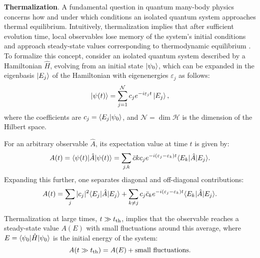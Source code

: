 



\textbf{Thermalization}.
A fundamental question in quantum many-body physics concerns how and under which conditions an isolated quantum system approaches thermal equilibrium. Intuitively, thermalization implies that after sufficient evolution time, local observables lose memory of the system's initial conditions and approach steady-state values corresponding to thermodynamic equilibrium \cite{khlebnikov_thermalization_2014}. To formalize this concept, consider an isolated quantum system described by a Hamiltonian $\hat{H}$, evolving from an initial state $\left| \psi_0 \right\rangle$, which can be expanded in the eigenbasis ${\left| E_j \right\rangle}$ of the Hamiltonian with eigenenergies $\varepsilon_j$ as follows:
\begin{equation*}
\left| \psi(t) \right\rangle = \sum_{j=1}^{\mathcal{N}} c_j e^{- i \varepsilon_j t} \left| E_j \right\rangle,
\label{eq:evolution}
\end{equation*}
where the coefficients are $c_j = \bk{E_j}{\psi_0}$, and $\mathcal{N} = \dim\mathcal{H}$ is the dimension of the Hilbert space.

For an arbitrary observable $\hat{A}$, its expectation value at time $t$ is given by:
\begin{equation*}
A(t) = \bk{\psi(t)}[\hat{A}]{\psi(t)}
= \sum_{j,k} \bar{c}k c_j e^{-i (\varepsilon_j - \varepsilon_k) t} \bk{E_k}[\hat{A}]{E_j}.
\label{eq:observable_time}
\end{equation*}
Expanding this further, one separates diagonal and off-diagonal contributions:
\begin{equation}
A(t) = \sum_j |c_j|^2 \bk{E_j}[\hat{A}]{E_j}
+ \sum_{k \neq j} c_j \bar{c}_k e^{-i (\varepsilon_j - \varepsilon_k) t} \bk{E_k}[\hat{A}]{E_j}.
\label{eq:At_expanded}
\end{equation}

Thermalization at large times, $t \gg t_{\textnormal{th}}$, implies that the observable reaches a steady-state value $A(E)$ with small fluctuations around this average, where $E = \bk{\psi_0}[\hat{H}]{\psi_0}$ is the initial energy of the system:
\begin{equation*}
A(t \gg t_{\textnormal{th}}) = A(E) + \text{small fluctuations}.
\label{eq:thermal_limit}
\end{equation*}

